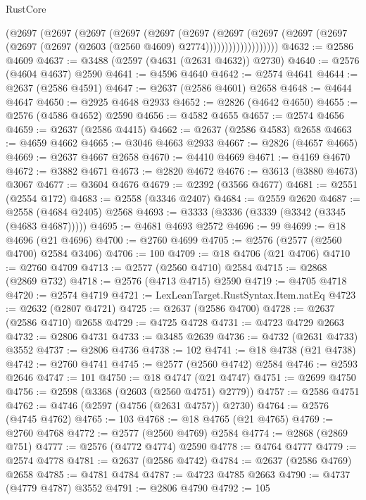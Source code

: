 \begin{lexlean}{RustCore}
\begin{coremodule}
                (@2697
                  (@2697
                    (@2697
                      (@2697
                        (@2697
                          (@2697
                            (@2697
                              (@2697
                                (@2697
                                  (@2697 (@2697 (@2697 (@2603 (@2560 @4609) @2774)))))))))))))))))))
@4632 := @2586 @4609
@4637 := @3488 (@2597 (@4631 (@2631 @4632)) @2730)
@4640 := @2576 (@4604 @4637) @2590
@4641 := @4596 @4640
@4642 := @2574 @4641
@4644 := @2637 (@2586 @4591)
@4647 := @2637 (@2586 @4601) @2658
@4648 := @4644 @4647
@4650 := @2925 @4648 @2933
@4652 := @2826 (@4642 @4650)
@4655 := @2576 (@4586 @4652) @2590
@4656 := @4582 @4655
@4657 := @2574 @4656
@4659 := @2637 (@2586 @4415)
@4662 := @2637 (@2586 @4583) @2658
@4663 := @4659 @4662
@4665 := @3046 @4663 @2933
@4667 := @2826 (@4657 @4665)
@4669 := @2637 @4667 @2658
@4670 := @4410 @4669
@4671 := @4169 @4670
@4672 := @3882 @4671
@4673 := @2820 @4672
@4676 := @3613 (@3880 @4673) @3067
@4677 := @3604 @4676
@4679 := @2392 (@3566 @4677)
@4681 := @2551 (@2554 @172)
@4683 := @2558 (@3346 @2407)
@4684 := @2559 @2620
@4687 := @2558 (@4684 @2405) @2568
@4693 := @3333 (@3336 (@3339 (@3342 (@3345 (@4683 @4687)))))
@4695 := @4681 @4693 @2572
@4696 := 99
@4699 := @18 @4696 (@21 @4696)
@4700 := @2760 @4699
@4705 := @2576 (@2577 (@2560 @4700) @2584 @3406)
@4706 := 100
@4709 := @18 @4706 (@21 @4706)
@4710 := @2760 @4709
@4713 := @2577 (@2560 @4710) @2584
@4715 := @2868 (@2869 @732)
@4718 := @2576 (@4713 @4715) @2590
@4719 := @4705 @4718
@4720 := @2574 @4719
@4721 := LexLeanTarget.RustSyntax.Item.natEq
@4723 := @2632 (@2807 @4721)
@4725 := @2637 (@2586 @4700)
@4728 := @2637 (@2586 @4710) @2658
@4729 := @4725 @4728
@4731 := @4723 @4729 @2663
@4732 := @2806 @4731
@4733 := @3485 @2639
@4736 := @4732 (@2631 @4733) @3552
@4737 := @2806 @4736
@4738 := 102
@4741 := @18 @4738 (@21 @4738)
@4742 := @2760 @4741
@4745 := @2577 (@2560 @4742) @2584
@4746 := @2593 @2646
@4747 := 101
@4750 := @18 @4747 (@21 @4747)
@4751 := @2699 @4750
@4756 := @2598 (@3368 (@2603 (@2560 @4751) @2779))
@4757 := @2586 @4751
@4762 := @4746 (@2597 (@4756 (@2631 @4757)) @2730)
@4764 := @2576 (@4745 @4762)
@4765 := 103
@4768 := @18 @4765 (@21 @4765)
@4769 := @2760 @4768
@4772 := @2577 (@2560 @4769) @2584
@4774 := @2868 (@2869 @751)
@4777 := @2576 (@4772 @4774) @2590
@4778 := @4764 @4777
@4779 := @2574 @4778
@4781 := @2637 (@2586 @4742)
@4784 := @2637 (@2586 @4769) @2658
@4785 := @4781 @4784
@4787 := @4723 @4785 @2663
@4790 := @4737 (@4779 @4787) @3552
@4791 := @2806 @4790
@4792 := 105

\end{coremodule}
\end{lexlean}
